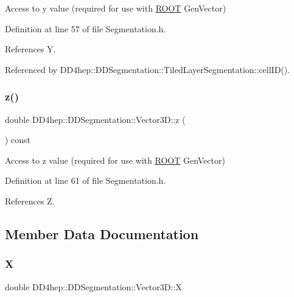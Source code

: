 Access to y value (required for use with \hyperlink{namespace_r_o_o_t}{R\+O\+OT} Gen\+Vector) 



Definition at line 57 of file Segmentation.\+h.



References Y.



Referenced by D\+D4hep\+::\+D\+D\+Segmentation\+::\+Tiled\+Layer\+Segmentation\+::cell\+I\+D().

\hypertarget{struct_d_d4hep_1_1_d_d_segmentation_1_1_vector3_d_a9b9ed1ddd7b4d7a559e25f8e29848de6}{}\label{struct_d_d4hep_1_1_d_d_segmentation_1_1_vector3_d_a9b9ed1ddd7b4d7a559e25f8e29848de6} 
\subsubsection{\texorpdfstring{z()}{z()}}
{\footnotesize\ttfamily double D\+D4hep\+::\+D\+D\+Segmentation\+::\+Vector3\+D\+::z (\begin{DoxyParamCaption}{ }\end{DoxyParamCaption}) const\hspace{0.3cm}{\ttfamily [inline]}}



Access to z value (required for use with \hyperlink{namespace_r_o_o_t}{R\+O\+OT} Gen\+Vector) 



Definition at line 61 of file Segmentation.\+h.



References Z.



\subsection{Member Data Documentation}
\hypertarget{struct_d_d4hep_1_1_d_d_segmentation_1_1_vector3_d_ac48f4f10c3545a48be92b2f970177868}{}\label{struct_d_d4hep_1_1_d_d_segmentation_1_1_vector3_d_ac48f4f10c3545a48be92b2f970177868} 
\subsubsection{\texorpdfstring{X}{X}}
{\footnotesize\ttfamily double D\+D4hep\+::\+D\+D\+Segmentation\+::\+Vector3\+D\+::X}



